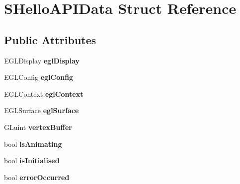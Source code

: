 \hypertarget{struct_s_hello_a_p_i_data}{\section{S\+Hello\+A\+P\+I\+Data Struct Reference}
\label{struct_s_hello_a_p_i_data}
}
\subsection*{Public Attributes}
\begin{DoxyCompactItemize}
\item 
\hypertarget{struct_s_hello_a_p_i_data_a2617ce044e9d5081a7b32175957bffca}{E\+G\+L\+Display {\bfseries egl\+Display}}\label{struct_s_hello_a_p_i_data_a2617ce044e9d5081a7b32175957bffca}

\item 
\hypertarget{struct_s_hello_a_p_i_data_a859c8d284cb56e2995ad7031659a2604}{E\+G\+L\+Config {\bfseries egl\+Config}}\label{struct_s_hello_a_p_i_data_a859c8d284cb56e2995ad7031659a2604}

\item 
\hypertarget{struct_s_hello_a_p_i_data_aeefc92bd9a88a328a08e2cffa2cd4887}{E\+G\+L\+Context {\bfseries egl\+Context}}\label{struct_s_hello_a_p_i_data_aeefc92bd9a88a328a08e2cffa2cd4887}

\item 
\hypertarget{struct_s_hello_a_p_i_data_aa9227592087aa913771622aa44dbe9ba}{E\+G\+L\+Surface {\bfseries egl\+Surface}}\label{struct_s_hello_a_p_i_data_aa9227592087aa913771622aa44dbe9ba}

\item 
\hypertarget{struct_s_hello_a_p_i_data_a9a1aa4e3431a3015d54ab2362f052850}{G\+Luint {\bfseries vertex\+Buffer}}\label{struct_s_hello_a_p_i_data_a9a1aa4e3431a3015d54ab2362f052850}

\item 
\hypertarget{struct_s_hello_a_p_i_data_aff8cd306c98d0802fc8a39c434f348b7}{bool {\bfseries is\+Animating}}\label{struct_s_hello_a_p_i_data_aff8cd306c98d0802fc8a39c434f348b7}

\item 
\hypertarget{struct_s_hello_a_p_i_data_a30a6e609b3167d918727cac05beb6b16}{bool {\bfseries is\+Initialised}}\label{struct_s_hello_a_p_i_data_a30a6e609b3167d918727cac05beb6b16}

\item 
\hypertarget{struct_s_hello_a_p_i_data_a56e884e33c0eadd408d5de97a906187d}{bool {\bfseries error\+Occurred}}\label{struct_s_hello_a_p_i_data_a56e884e33c0eadd408d5de97a906187d}


\end{DoxyCompactItemize}
